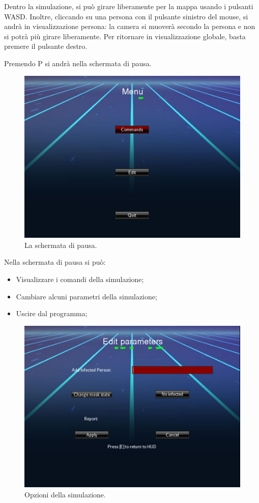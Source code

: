 \documentclass[a4paper,12pt]{report}
\begin{document}
Dentro la simulazione, si può girare liberamente per la mappa usando i pulsanti WASD. Inoltre, cliccando su una persona con il pulsante sinistro del mouse, si andrà in visualizzazione persona: la camera si muoverà secondo la persona e non si potrà più girare liberamente. Per ritornare in visualizzazione globale, basta premere il pulsante destro.

\newpage

Premendo P si andrà nella schermata di pausa.

\begin{figure}[h]
\centering{}
\includegraphics{4.png} 
\caption{La schermata di pausa.}
\label{img:pause}
\end{figure}

Nella schermata di pausa si può:
\begin{itemize}
\item Visualizzare i comandi della simulazione;
\item Cambiare alcuni parametri della simulazione;
\item Uscire dal programma;
\end{itemize}

\newpage

\begin{figure}[h]
\centering{}
\includegraphics{5.png} 
\caption{Opzioni della simulazione.}
\label{img:edit}
\end{figure}
\end{document}
